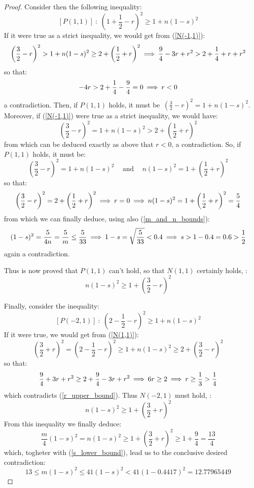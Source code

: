 \begin{proof}
Consider then the following inequality:
$$
\left[P(1, 1)\right]\::\;
\left(1 + \frac{1}{2} - r\right)^2 \geq 1 + n(1 - s)^2
$$
If it were true as a strict inequality, we would get
from (\ref{N(-1,1)}):
$$
\left(\frac{3}{2} - r\right)^2 > 1 + n(1 - s)^2 \geq
2 + \left(\frac{1}{2} + r\right)^2 \:\Longrightarrow\:
\frac{9}{4} -3r + r^2 > 2 + \frac{1}{4} +r + r^2
$$
so that:
$$
- 4r > 2 + \frac{1}{4} - \frac{9}{4} = 0
\:\Longrightarrow\: r < 0
$$
a contradiction.
Then, if $P(1,1)$ holds, it must be\,
$\left(\frac{3}{2} - r\right)^2 = 1 + n(1 - s)^2$.
Moreover, if (\ref{N(-1,1)}) were true as a strict
inequality, we would have:
$$
\left(\frac{3}{2} - r\right)^2 = 1 + n(1 - s)^2 >
2 + \left(\frac{1}{2} + r\right)^2
$$
from which can be deduced exactly as above that $r < 0$,
a contradiction.
So, if $P(1,1)$ holds, it must be:
$$
\left(\frac{3}{2} - r\right)^2 = 1 + n(1 - s)^2
\quad\ \textrm{and}\ \quad
n(1 - s)^2 = 1 + \left(\frac{1}{2} + r\right)^2
$$
so that:
$$
\left(\frac{3}{2} - r\right)^2 =
2 + \left(\frac{1}{2} + r\right)^2 \:\Longrightarrow\: r = 0 \:\Longrightarrow\:
n (1 - s)^2 = 1 + \left(\frac{1}{2} + r\right)^2
= \frac{5}{4}
$$
from which we can finally deduce, using also
(\ref{m_and_n_bounds}):
$$
(1 - s)^2 = \frac{5}{4n} = \frac{5}{m} \leq \frac{5}{33}
\:\Longrightarrow\: 1 - s = \sqrt{\frac{5}{33}} < 0.4 \:\Longrightarrow\: s > 1 - 0.4
= 0.6 > \frac{1}{2}
$$
again a contradiction.

Thus is now proved that $P(1, 1)$ can't hold, so that
$N(1, 1)$ certainly holds, \ie:
\begin{equation}\label{N(1,1)}
n(1 - s)^2 \geq 1 + \left(\frac{3}{2} - r\right)^2
\end{equation}

Finally, consider the inequality:
$$
\left[P(-2, 1)\right]\::\;
\left(2 - \frac{1}{2} - r\right)^2 \geq 1 + n(1 - s)^2
$$
If it were true, we would get from (\ref{N(1,1)}):
$$
\left(\frac{3}{2} + r\right)^2 =
\left(2 - \frac{1}{2} - r\right)^2 \geq 1 + n(1 - s)^2
\geq 2 + \left(\frac{3}{2} - r\right)^2
$$
so that:
$$
\frac{9}{4} + 3r + r^2 \geq 2 + \frac{9}{4} - 3r + r^2
\:\Longrightarrow\: 6r \geq 2 \:\Longrightarrow\: r \geq \frac{1}{3} > \frac{1}{4}
$$
which contradicts (\ref{r_upper_bound}).
Thus $N(-2, 1)$ must hold, \ie:
\begin{equation}\label{N(-2,1)}
n(1 - s)^2 \geq 1 + \left(\frac{3}{2} + r\right)^2
\end{equation}
From this inequality we finally deduce:
$$
\frac{m}{4}(1 - s)^2 = n(1 - s)^2 \geq
1 + \left(\frac{3}{2} + r\right)^2 \geq
1 + \frac{9}{4} = \frac{13}{4}
$$
which, togheter with (\ref{s_lower_bound}), lead us to the
conclusive desired contradiction:
$$
13 \leq m(1 - s)^2 \leq 41(1 - s)^2
< 41(1 - 0.4417)^2 = 12.77965449
$$
%
\end{proof}
